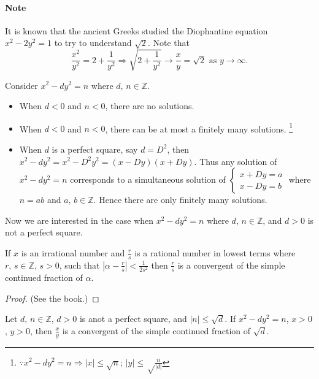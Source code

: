 
\paragraph{Note} It is known that the ancient Greeks studied the Diophantine equation $x^2-2y^2=1$ to
try to understand $\sqrt{2}$. Note that
\[
    \frac{x^2}{y^2} = 2+\frac{1}{y^2} \Rightarrow
    \sqrt{2+\frac{1}{y^2}} \rightarrow \frac{x}{y} = \sqrt{2} \mbox{ as } y \rightarrow \infty.
\]

Consider $x^2-dy^2=n$ where $d,\,n \in \mathbb{Z}$.
\begin{itemize}
    \item When $d<0$ and $n<0$, there are no solutions.
    \item When $d<0$ and $n<0$, there can be at most a finitely many solutions.
    \footnote{$\because x^2-dy^2=n \Rightarrow \left|x\right|\leq \sqrt{n}$;
    $\left|y\right|\leq\sqrt\frac{n}{\left|d\right|}$}
    \item When $d$ is a perfect square, say $d=D^2$, then $x^2-dy^2=x^2-D^2y^2
    =\left(x-Dy\right)\left(x+Dy\right)$. Thus any solution of $x^2-dy^2=n$ corresponds to
    a simultaneous solution of $\begin{cases}
        x+Dy=a \\
        x-Dy=b
    \end{cases}$ where $n=ab$ and $a,\,b\in\mathbb{Z}$. Hence there are only finitely many solutions.
\end{itemize}

Now we are interested in the case when $x^2-dy^2=n$ where $d,\,n\in\mathbb{Z}$, and $d>0$ is
not a perfect square.

\begin{theorem}
    If $x$ is an irrational number and $\frac{r}{s}$ is a rational number in lowest terms where
    $r,\,s\in\mathbb{Z}$, $s>0$, such that $\left|\alpha-\frac{r}{s}\right|<\frac{1}{2s^2}$ then
    $\frac{r}{s}$ is a convergent of the simple continued fraction of $\alpha$.
\end{theorem}
\begin{proof}
    (See the book.)
\end{proof}

\begin{theorem}
    Let $d,\,n\in\mathbb{Z}$, $d>0$ is anot a perfect square, and $\left|n\right|\leq\sqrt{d}$.
    If $x^2-dy^2=n$, $x>0$, $y>0$, then $\frac{x}{y}$ is a convergent of the simple continued
    fraction of $\sqrt{d}$.
\end{theorem}

